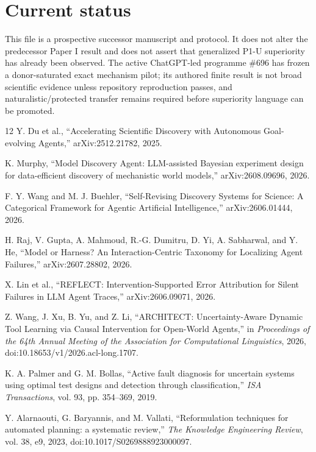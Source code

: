 \documentclass[11pt]{article}
\begin{document}
\section{Current status}
This file is a prospective successor manuscript and protocol. It does not alter the predecessor Paper I result and does not assert that generalized P1-U superiority has already been observed. The active ChatGPT-led programme \#696 has frozen a donor-saturated exact mechanism pilot; its authored finite result is not broad scientific evidence unless repository reproduction passes, and naturalistic/protected transfer remains required before superiority language can be promoted.

\begin{thebibliography}{12}
Y. Du et al., ``Accelerating Scientific Discovery with Autonomous Goal-evolving Agents,'' arXiv:2512.21782, 2025.

K. Murphy, ``Model Discovery Agent: LLM-assisted Bayesian experiment design for data-efficient discovery of mechanistic world models,'' arXiv:2608.09696, 2026.

F. Y. Wang and M. J. Buehler, ``Self-Revising Discovery Systems for Science: A Categorical Framework for Agentic Artificial Intelligence,'' arXiv:2606.01444, 2026.

H. Raj, V. Gupta, A. Mahmoud, R.-G. Dumitru, D. Yi, A. Sabharwal, and Y. He, ``Model or Harness? An Interaction-Centric Taxonomy for Localizing Agent Failures,'' arXiv:2607.28802, 2026.

X. Lin et al., ``REFLECT: Intervention-Supported Error Attribution for Silent Failures in LLM Agent Traces,'' arXiv:2606.09071, 2026.

Z. Wang, J. Xu, B. Yu, and Z. Li, ``ARCHITECT: Uncertainty-Aware Dynamic Tool Learning via Causal Intervention for Open-World Agents,'' in \emph{Proceedings of the 64th Annual Meeting of the Association for Computational Linguistics}, 2026, doi:10.18653/v1/2026.acl-long.1707.

K. A. Palmer and G. M. Bollas, ``Active fault diagnosis for uncertain systems using optimal test designs and detection through classification,'' \emph{ISA Transactions}, vol. 93, pp. 354--369, 2019.

Y. Alarnaouti, G. Baryannis, and M. Vallati, ``Reformulation techniques for automated planning: a systematic review,'' \emph{The Knowledge Engineering Review}, vol. 38, e9, 2023, doi:10.1017/S0269888923000097.
\end{thebibliography}
\end{document}
